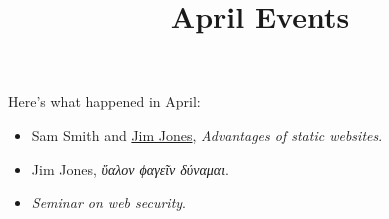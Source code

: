 \documentclass{article}
\title{April Events}
\begin{document}
\maketitle

Here's what happened in April:

\begin{itemize}
\tightlist
\item
  Sam Smith and \href{http://foo.bar/baz}{Jim Jones}, \emph{Advantages
  of static websites}.
\item
  Jim Jones, \emph{ὕαλον ϕαγεῖν δύναμαι}.
\item
  \emph{Seminar on web security}.
\end{itemize}
\end{document}
